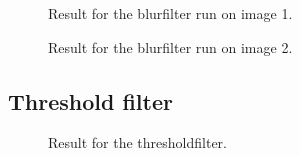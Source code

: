 \documentclass[titlepage, a4paper]{article}
\begin{document}
\begin{figure}[H]
  \centering
  \caption{Result for the blurfilter run on image 1.}
  \label{fig:im1-blur}
\end{figure}

\begin{figure}[H]
  \centering
  \caption{Result for the blurfilter run on image 2.}
  \label{fig:im2-blur}
\end{figure}


\subsection{Threshold filter}

\begin{figure}[H]
  \centering
  \caption{Result for the thresholdfilter.}
  \label{fig:threshold}
\end{figure}
\end{document}
